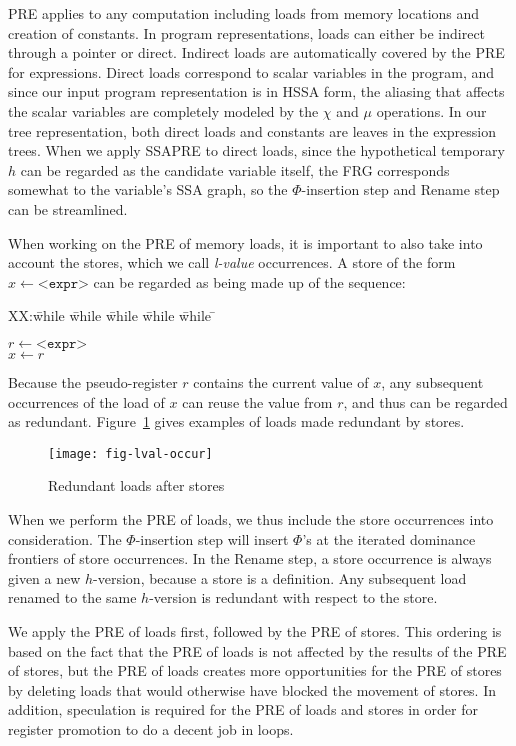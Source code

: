 PRE applies to any computation including loads from memory locations and
creation of constants.  In program representations, loads can either be indirect
through a pointer or direct.  Indirect loads are automatically covered by
the PRE for expressions.  Direct loads correspond to scalar variables in the
program, and since our input program representation is in HSSA form, the 
aliasing that affects the scalar variables are completely modeled by the
$\chi$ and $\mu$ operations.  In our tree representation, both
direct loads  and constants are leaves in the expression trees.  
When we apply SSAPRE to direct loads, since the hypothetical temporary $h$ can
be regarded as the candidate variable itself, the FRG corresponds somewhat to
the variable's SSA graph, so the $\Phi$-insertion step and
Rename step can be streamlined. 

When working on the PRE of memory loads, it is important to also take into
account the stores, which we call \emph{l-value} occurrences.  A store of the 
form $x \leftarrow \texttt{<expr>}$ can be regarded as being made up of the
sequence:
\begin{tabbing}
XX:\= while \= while \= while \= while \= while \= \kill

\> \> $r \leftarrow \texttt{<expr>}$ \\
\> \> $x \leftarrow r$ \\
\end{tabbing}
Because the pseudo-register $r$ contains the current value of $x$, any
subsequent occurrences of the load of $x$ can reuse the value from $r$, and
thus can be regarded as redundant.   Figure~\ref{fig:lval-occur} gives examples
of loads made redundant by stores.

\begin{figure}
\centering
\texttt{[image: fig-lval-occur]}
\caption{Redundant loads after stores}
\label{fig:lval-occur}
\end{figure}

When we perform the PRE of loads, we thus include the store occurrences into
consideration.  The $\Phi$-insertion step will insert $\Phi$'s at the iterated
dominance frontiers of store occurrences.  In the Rename step, a store
occurrence is always given a new $h$-version, because a store is a definition.
Any subsequent load renamed to the same $h$-version is redundant with respect
to the store.

We apply the PRE of loads
first, followed by the PRE of stores.  This ordering is based on the fact that
the PRE of loads is not affected by the results of the PRE of stores, but the
PRE of loads creates more opportunities for the PRE of stores by deleting
loads that would otherwise have blocked the movement of stores.  In addition,
speculation is required for the PRE of loads and stores in order for register
promotion to do a decent job in loops.  

